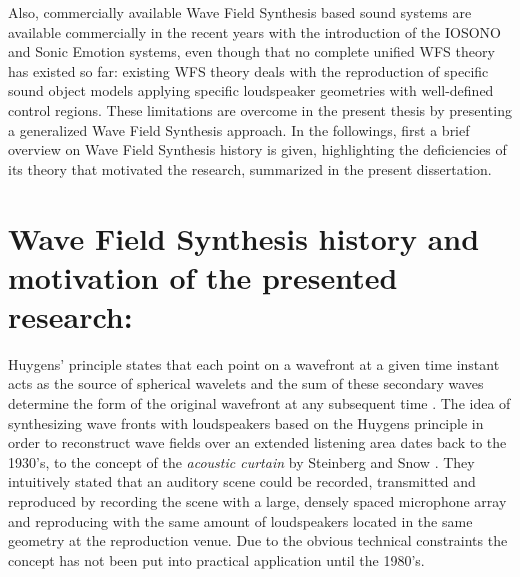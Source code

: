Also, commercially available Wave Field Synthesis based sound systems are available commercially in the recent years with the introduction of the IOSONO and Sonic Emotion systems,
even though that no complete unified WFS theory has existed so far:
existing WFS theory deals with the reproduction of specific sound object models applying specific loudspeaker geometries with well-defined control regions.
These limitations are overcome in the present thesis by presenting a generalized Wave Field Synthesis approach.
In the followings, first a brief overview on Wave Field Synthesis history is given, highlighting the deficiencies of its theory that motivated the research, summarized in the present dissertation.

\section{Wave Field Synthesis history and motivation of the presented research:}

Huygens' principle states that each point on a wavefront at a given time instant acts as the source of spherical wavelets and the sum of these secondary waves determine the form of the original wavefront at any subsequent time \cite{Huygens1690}.
The idea of synthesizing wave fronts with loudspeakers based on the Huygens principle in order to reconstruct wave fields over an extended listening area dates back to the 1930's, to the concept of the \emph{acoustic curtain} by Steinberg and Snow \cite{Steinberg1934}.
They intuitively stated that an auditory scene could be recorded, transmitted and reproduced by recording the scene with a large, densely spaced microphone array and reproducing with the same amount of loudspeakers located in the same geometry at the reproduction venue.
Due to the obvious technical constraints the concept has not been put into practical application until the 1980's.

